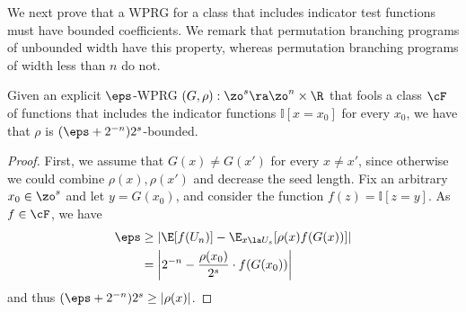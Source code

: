 We next prove that a WPRG for a class that includes indicator test functions must have bounded coefficients. We remark that permutation branching programs %
of  %
unbounded width have this property, whereas permutation branching programs of width less
than $n$ do not. 
\begin{proposition}
  Given an explicit $\eps$-WPRG $(G,\rho):\zo^s\ra\zo^n\times \R$ that fools a
%
class $\cF$ of functions   %
that includes the indicator functions $\mathbb{I}[x=x_0]$ for every $x_0$, we have that $\rho$ is $(\eps+2^{-n})2^{s}$-bounded.
\end{proposition}
\begin{proof}
    First, we assume that $G(x)\neq G(x')$ for every $x\neq x'$, since otherwise we could combine $\rho(x),\rho(x')$ and decrease the seed length. Fix an arbitrary $x_0\in \zo^s$ and let $y=G(x_0)$, and consider the function $f(z)=\mathbb{I}[z=y]$. As $f\in \cF$, we have
    \begin{align*}
        \eps &\geq \left|\E[f(U_n)] - \E_{x\la U_s}[\rho(x)f(G(x))] \right|\\
        &= \left|2^{-n}-\frac{\rho(x_0)}{2^s}\cdot %
        f(G(x_0))\right|
    \end{align*}
    and thus $(\eps+2^{-n})2^s\geq |\rho(x)|$.
\end{proof}

